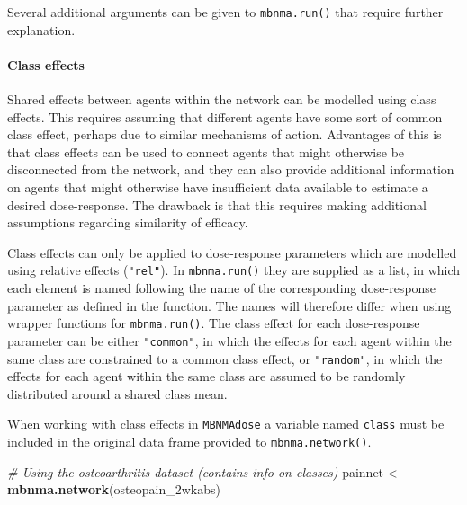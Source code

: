 \documentclass[]{article}
\newenvironment{Shaded}{\begin{snugshade}}{\end{snugshade}}
\newcommand{\CommentTok}[1]{\textcolor[rgb]{0.56,0.35,0.01}{\textit{#1}}}
\newcommand{\KeywordTok}[1]{\textcolor[rgb]{0.13,0.29,0.53}{\textbf{#1}}}
\newcommand{\NormalTok}[1]{#1}
\newcommand{\StringTok}[1]{\textcolor[rgb]{0.31,0.60,0.02}{#1}}
\let\oldparagraph\paragraph
\renewcommand{\paragraph}[1]{\oldparagraph{#1}\mbox{}}
\begin{document}
Several additional arguments can be given to \texttt{mbnma.run()} that
require further explanation.

\hypertarget{class-effects}{%
\paragraph{Class effects}\label{class-effects}}

Shared effects between agents within the network can be modelled using
class effects. This requires assuming that different agents have some
sort of common class effect, perhaps due to similar mechanisms of
action. Advantages of this is that class effects can be used to connect
agents that might otherwise be disconnected from the network, and they
can also provide additional information on agents that might otherwise
have insufficient data available to estimate a desired dose-response.
The drawback is that this requires making additional assumptions
regarding similarity of efficacy.

Class effects can only be applied to dose-response parameters which are
modelled using relative effects (\texttt{"rel"}). In
\texttt{mbnma.run()} they are supplied as a list, in which each element
is named following the name of the corresponding dose-response parameter
as defined in the function. The names will therefore differ when using
wrapper functions for \texttt{mbnma.run()}. The class effect for each
dose-response parameter can be either \texttt{"common"}, in which the
effects for each agent within the same class are constrained to a common
class effect, or \texttt{"random"}, in which the effects for each agent
within the same class are assumed to be randomly distributed around a
shared class mean.

When working with class effects in \texttt{MBNMAdose} a variable named
\texttt{class} must be included in the original data frame provided to
\texttt{mbnma.network()}.

\begin{Shaded}
\begin{Highlighting}[]
\CommentTok{# Using the osteoarthritis dataset (contains info on classes)}
\NormalTok{painnet <-}\StringTok{ }\KeywordTok{mbnma.network}\NormalTok{(osteopain_2wkabs)}
\end{Highlighting}
\end{Shaded}
\end{document}
